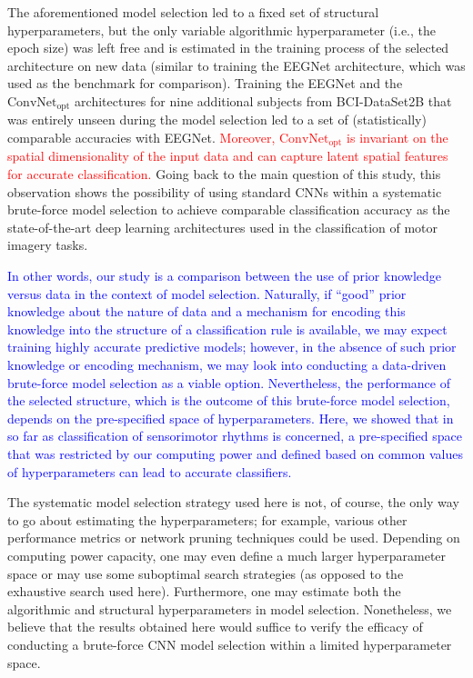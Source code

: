 \documentclass{ieeeaccess}
\newcommand{\quotes}[1]{``#1''}
\begin{document}
{The aforementioned model selection led to a fixed set of structural hyperparameters, but the only variable algorithmic hyperparameter (i.e., the epoch size) was left free and is estimated in the training process of the selected architecture on new data (similar to training the EEGNet architecture, which was used as the benchmark for comparison). Training the EEGNet and the $\text{ConvNet}_{\text{opt}}$ architectures for nine additional subjects from BCI-DataSet2B that was entirely unseen during the model selection led to a set of (statistically) comparable accuracies with EEGNet. \textcolor{red}{Moreover, $\text{ConvNet}_{\text{opt}}$ is invariant on the spatial dimensionality of the input data and can capture latent spatial features for accurate classification.} Going back to the main question of this study, this observation shows the possibility of using standard CNNs within a systematic brute-force model selection to achieve comparable classification accuracy as the state-of-the-art deep learning architectures used in the classification of motor imagery tasks. 
    
    \textcolor{blue}{In other words, our study is a comparison between the use of prior knowledge versus data in the context of model selection. Naturally, if  \quotes{good} prior knowledge about the nature of data and a mechanism for encoding this knowledge into the structure of a classification rule is available, we may expect training highly accurate predictive models; however, in the absence of such prior knowledge or encoding mechanism, we may look into conducting a data-driven brute-force model selection as a viable option. Nevertheless, the performance of the selected structure, which is the outcome of this brute-force model selection, depends on the pre-specified space of hyperparameters. Here, we showed that in so far as classification of sensorimotor rhythms is concerned, a pre-specified space that was restricted by our computing power and defined based on common values of hyperparameters can lead to accurate classifiers.} 
    
    {The systematic model selection strategy used here is not, of course, the only way to go about estimating the hyperparameters; for example, various other performance metrics or network pruning techniques could be used. Depending on computing power capacity, one may even define a much larger hyperparameter space or may use some suboptimal search strategies (as opposed to the exhaustive search used here). Furthermore, one may estimate both the algorithmic and structural hyperparameters in model selection. Nonetheless, we believe that the results obtained here would suffice to verify the efficacy of conducting a brute-force CNN model selection within a limited hyperparameter space.}
  
}
\end{document}
